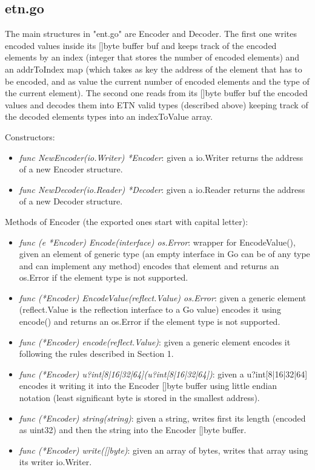 \subsection{etn.go}

The main structures in "ent.go" are Encoder and Decoder. The first one writes encoded values inside its []byte buffer buf and keeps track of the encoded elements by an index (integer that stores the number of encoded elements) and an addrToIndex map (which takes as key the address of the element that has to be encoded, and as value the current number of encoded elements and the type of the current element). The second one reads from its []byte buffer buf the encoded values and decodes them into ETN valid types (described above) keeping track of the decoded elements types into an indexToValue array.

Constructors:

\begin{itemize}

	\item \emph{func NewEncoder(io.Writer) *Encoder}: given a io.Writer returns the address of a new Encoder structure.
	\item \emph{func NewDecoder(io.Reader) *Decoder}: given a io.Reader returns the address of a new Decoder structure.

\end{itemize}

Methods of Encoder (the exported ones start with capital letter):

\begin{itemize}

	\item \emph{func (e *Encoder)  Encode(interface{}) os.Error}: wrapper for EncodeValue(), given an element of generic type (an empty interface in Go can be of any type and can implement any method) encodes that element and returns an os.Error if the element type is not supported.
	\item \emph{func (*Encoder) EncodeValue(reflect.Value) os.Error}: given a generic element (reflect.Value is the reflection interface to a Go value) encodes it using encode() and returns an os.Error if the element type is not supported.
	\item \emph{func (*Encoder) encode(reflect.Value)}: given a generic element encodes it following the rules described in Section 1.
	\item \emph{func (*Encoder) u?int[8|16|32|64](u?int[8|16|32|64])}: given a u?int[8|16|32|64] encodes it writing it into the Encoder []byte buffer using little endian notation (least significant byte is stored in the smallest address).
	\item \emph{func (*Encoder) string(string)}: given a string, writes first its length (encoded as uint32) and then the string into the Encoder []byte buffer.
	\item \emph{func (*Encoder) write([]byte)}: given an array of bytes, writes that array using its writer io.Writer.

\end{itemize}

